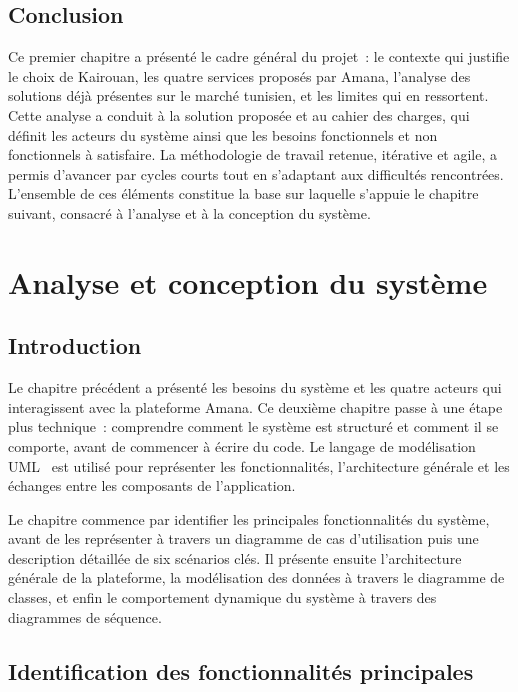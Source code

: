 \documentclass[12pt,fleqn,a4paper]{report}
\begin{document}
\begin{justify}
\section{Conclusion}

Ce premier chapitre a présenté le cadre général du projet~: le contexte qui justifie le choix de Kairouan, les quatre services proposés par Amana, l'analyse des solutions déjà présentes sur le marché tunisien, et les limites qui en ressortent. Cette analyse a conduit à la solution proposée et au cahier des charges, qui définit les acteurs du système ainsi que les besoins fonctionnels et non fonctionnels à satisfaire. La méthodologie de travail retenue, itérative et agile, a permis d'avancer par cycles courts tout en s'adaptant aux difficultés rencontrées. L'ensemble de ces éléments constitue la base sur laquelle s'appuie le chapitre suivant, consacré à l'analyse et à la conception du système.

\chapter{Analyse et conception du système}

\section{Introduction}

Le chapitre précédent a présenté les besoins du système et les quatre acteurs qui interagissent avec la plateforme Amana. Ce deuxième chapitre passe à une étape plus technique~: comprendre comment le système est structuré et comment il se comporte, avant de commencer à écrire du code. Le langage de modélisation UML~\cite{omg_uml} est utilisé pour représenter les fonctionnalités, l'architecture générale et les échanges entre les composants de l'application.

Le chapitre commence par identifier les principales fonctionnalités du système, avant de les représenter à travers un diagramme de cas d'utilisation puis une description détaillée de six scénarios clés. Il présente ensuite l'architecture générale de la plateforme, la modélisation des données à travers le diagramme de classes, et enfin le comportement dynamique du système à travers des diagrammes de séquence.

\section{Identification des fonctionnalités principales}


\end{justify}
\end{document}
